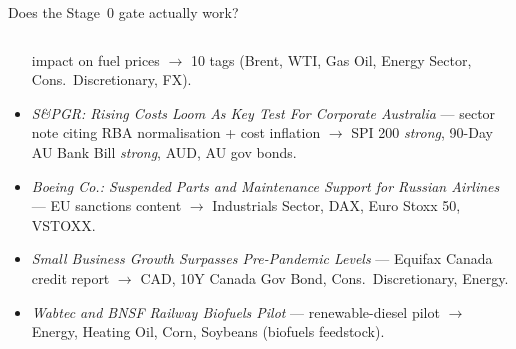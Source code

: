 \documentclass[10pt,aspectratio=169]{beamer}
\begin{document}
\begin{frame}{Does the Stage~0 gate actually work?}
\begin{columns}[T,onlytextwidth]
\begin{column}{0.49\textwidth}
\begin{itemize}
              impact on fuel prices $\rightarrow$ 10 tags (Brent, WTI, Gas Oil, Energy Sector,
              Cons.\ Discretionary, FX).
        \item \emph{S\&PGR: Rising Costs Loom As Key Test For Corporate Australia} --- sector
              note citing RBA normalisation + cost inflation $\rightarrow$ SPI 200 \emph{strong},
              90-Day AU Bank Bill \emph{strong}, AUD, AU gov bonds.
        \item \emph{Boeing Co.: Suspended Parts and Maintenance Support for Russian Airlines}
              --- EU sanctions content $\rightarrow$ Industrials Sector, DAX, Euro Stoxx 50,
              VSTOXX.
        \item \emph{Small Business Growth Surpasses Pre-Pandemic Levels} --- Equifax Canada
              credit report $\rightarrow$ CAD, 10Y Canada Gov Bond, Cons.\ Discretionary,
              Energy.
        \item \emph{Wabtec and BNSF Railway Biofuels Pilot} --- renewable-diesel pilot
              $\rightarrow$ Energy, Heating Oil, Corn, Soybeans (biofuels feedstock).
      \end{itemize}
    \end{column}
  \end{columns}
\end{frame}
\end{document}
